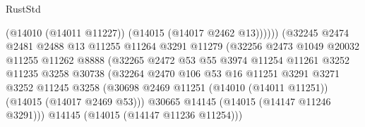 \begin{lexlean}{RustStd}
\begin{coremodule}
                                              (@14010 (@14011 @11227))
                                              (@14015 (@14017 @2462 @13))))))
                                      (@32245
                                        @2474
                                        @2481
                                        @2488
                                        @13
                                        @11255
                                        @11264
                                        @3291
                                        @11279
                                        (@32256
                                          @2473
                                          @1049
                                          @20032
                                          @11255
                                          @11262
                                          @8888
                                          (@32265
                                            @2472
                                            @53
                                            @55
                                            @3974
                                            @11254
                                            @11261
                                            @3252
                                            @11235
                                            @3258
                                            @30738
                                            (@32264
                                              @2470
                                              @106
                                              @53
                                              @16
                                              @11251
                                              @3291
                                              @3271
                                              @3252
                                              @11245
                                              @3258
                                              (@30698
                                                @2469
                                                @11251
                                                (@14010 (@14011 @11251))
                                                (@14015 (@14017 @2469 @53)))
                                              @30665
                                              @14145
                                              (@14015 (@14147 @11246 @3291)))
                                            @14145
                                            (@14015 (@14147 @11236 @11254)))

\end{coremodule}
\end{lexlean}
